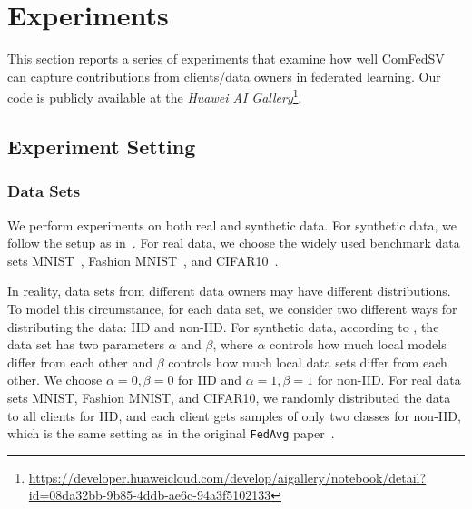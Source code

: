 \section{Experiments} \label{sec:7-7}
This section reports a series of experiments that examine how well ComFedSV can capture contributions from clients/data owners in federated learning. Our code is publicly available at the \emph{Huawei AI Gallery}\footnote{\url{https://developer.huaweicloud.com/develop/aigallery/notebook/detail?id=08da32bb-9b85-4ddb-ae6c-94a3f5102133}}.

\subsection{Experiment Setting} \label{sec:7-7-1}

\subsubsection{Data Sets} 
We perform experiments on both real and synthetic data. For synthetic data, we follow the setup as in~\cite{li2018federated}. For real data, we choose the widely used benchmark data sets MNIST~\cite{lecun-mnisthandwrittendigit-2010}, Fashion MNIST~\cite{xiao2017fashion}, and CIFAR10~\cite{krizhevsky2009learning}.  

In reality, data sets from different data owners may have different distributions. To model this circumstance, for each data set, we consider two different ways for distributing the data: IID and non-IID. For synthetic data, according to \cite{li2018federated}, the data set has two parameters $\alpha$ and $\beta$, where $\alpha$ controls how much local models differ from each other and $\beta$ controls how much local data sets differ from each other. We choose $\alpha=0, \beta=0$ for IID and $\alpha=1, \beta=1$ for non-IID. For real data sets MNIST, Fashion MNIST, and CIFAR10, we randomly distributed the data to all clients for IID, and each client gets samples of only two classes for non-IID, which is the same setting as in the original \texttt{FedAvg} paper~\cite{mcmahan2017communication}.


